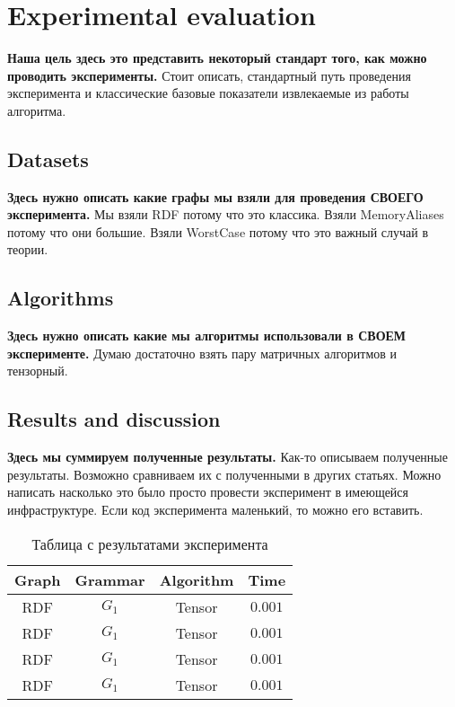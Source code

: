 \section{Experimental evaluation}
\textbf{Наша цель здесь это представить некоторый стандарт того, как можно проводить эксперименты.}
Стоит описать, стандартный путь проведения эксперимента и классические базовые показатели извлекаемые из работы алгоритма.

\subsection{Datasets}
\textbf{Здесь нужно описать какие графы мы взяли для проведения СВОЕГО эксперимента.}
Мы взяли RDF потому что это классика. 
Взяли MemoryAliases потому что они большие. 
Взяли WorstCase потому что это важный случай в теории.

\subsection{Algorithms}
\textbf{Здесь нужно описать какие мы алгоритмы использовали в СВОЕМ эксперименте.}
Думаю достаточно взять пару матричных алгоритмов и тензорный.

\subsection{Results and discussion}
\textbf{Здесь мы суммируем полученные результаты.}
Как-то описываем полученные результаты.
Возможно сравниваем их с полученными в других статьях.
Можно написать насколько это было просто провести эксперимент в имеющейся инфраструктуре.
Если код эксперимента маленький, то можно его вставить.

\begin{table}
  \caption{Таблица с результатами эксперимента}
  \label{tab:results}
  \begin{tabular}{cccc}
    \toprule
    Graph & Grammar & Algorithm & Time\\
    \midrule
    RDF&$G_1$&Tensor&$0.001$\\
    RDF&$G_1$&Tensor&$0.001$\\
    RDF&$G_1$&Tensor&$0.001$\\
    RDF&$G_1$&Tensor&$0.001$\\
  \bottomrule
\end{tabular}
\end{table}
